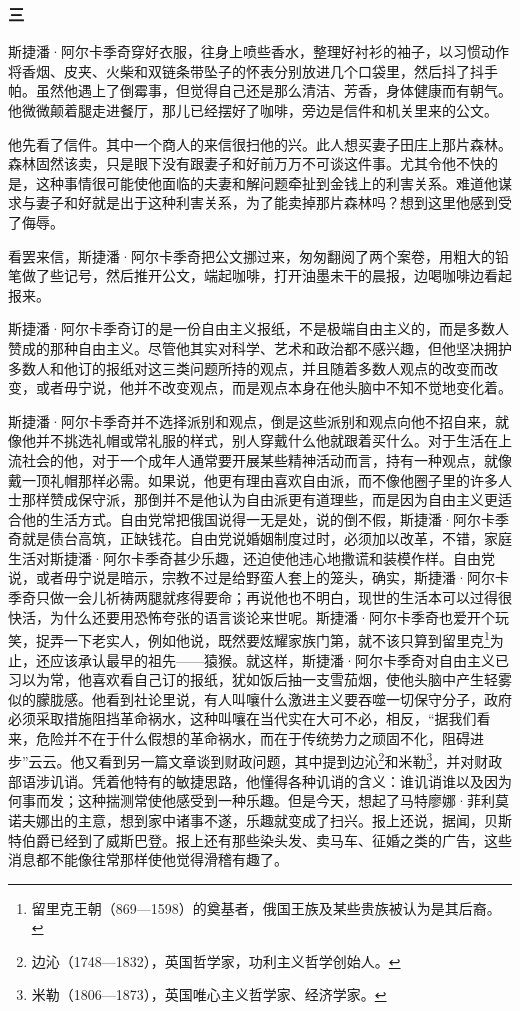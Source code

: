 \subsubsection*{三}

\par 斯捷潘·阿尔卡季奇穿好衣服，往身上喷些香水，整理好衬衫的袖子，以习惯动作将香烟、皮夹、火柴和双链条带坠子的怀表分别放进几个口袋里，然后抖了抖手帕。虽然他遇上了倒霉事，但觉得自己还是那么清洁、芳香，身体健康而有朝气。他微微颠着腿走进餐厅，那儿已经摆好了咖啡，旁边是信件和机关里来的公文。
\par 他先看了信件。其中一个商人的来信很扫他的兴。此人想买妻子田庄上那片森林。森林固然该卖，只是眼下没有跟妻子和好前万万不可谈这件事。尤其令他不快的是，这种事情很可能使他面临的夫妻和解问题牵扯到金钱上的利害关系。难道他谋求与妻子和好就是出于这种利害关系，为了能卖掉那片森林吗？想到这里他感到受了侮辱。
\par 看罢来信，斯捷潘·阿尔卡季奇把公文挪过来，匆匆翻阅了两个案卷，用粗大的铅笔做了些记号，然后推开公文，端起咖啡，打开油墨未干的晨报，边喝咖啡边看起报来。
\par 斯捷潘·阿尔卡季奇订的是一份自由主义报纸，不是极端自由主义的，而是多数人赞成的那种自由主义。尽管他其实对科学、艺术和政治都不感兴趣，但他坚决拥护多数人和他订的报纸对这三类问题所持的观点，并且随着多数人观点的改变而改变，或者毋宁说，他并不改变观点，而是观点本身在他头脑中不知不觉地变化着。
\par 斯捷潘·阿尔卡季奇并不选择派别和观点，倒是这些派别和观点向他不招自来，就像他并不挑选礼帽或常礼服的样式，别人穿戴什么他就跟着买什么。对于生活在上流社会的他，对于一个成年人通常要开展某些精神活动而言，持有一种观点，就像戴一顶礼帽那样必需。如果说，他更有理由喜欢自由派，而不像他圈子里的许多人士那样赞成保守派，那倒并不是他认为自由派更有道理些，而是因为自由主义更适合他的生活方式。自由党常把俄国说得一无是处，说的倒不假，斯捷潘·阿尔卡季奇就是债台高筑，正缺钱花。自由党说婚姻制度过时，必须加以改革，不错，家庭生活对斯捷潘·阿尔卡季奇甚少乐趣，还迫使他违心地撒谎和装模作样。自由党说，或者毋宁说是暗示，宗教不过是给野蛮人套上的笼头，确实，斯捷潘·阿尔卡季奇只做一会儿祈祷两腿就疼得要命；再说他也不明白，现世的生活本可以过得很快活，为什么还要用恐怖夸张的语言谈论来世呢。斯捷潘·阿尔卡季奇也爱开个玩笑，捉弄一下老实人，例如他说，既然要炫耀家族门第，就不该只算到留里克\footnote{留里克王朝（869—1598）的奠基者，俄国王族及某些贵族被认为是其后裔。}为止，还应该承认最早的祖先——猿猴。就这样，斯捷潘·阿尔卡季奇对自由主义已习以为常，他喜欢看自己订的报纸，犹如饭后抽一支雪茄烟，使他头脑中产生轻雾似的朦胧感。他看到社论里说，有人叫嚷什么激进主义要吞噬一切保守分子，政府必须采取措施阻挡革命祸水，这种叫嚷在当代实在大可不必，相反，“据我们看来，危险并不在于什么假想的革命祸水，而在于传统势力之顽固不化，阻碍进步”云云。他又看到另一篇文章谈到财政问题，其中提到边沁\footnote{边沁（1748—1832），英国哲学家，功利主义哲学创始人。}和米勒\footnote{米勒（1806—1873），英国唯心主义哲学家、经济学家。}，并对财政部语涉讥诮。凭着他特有的敏捷思路，他懂得各种讥诮的含义：谁讥诮谁以及因为何事而发；这种揣测常使他感受到一种乐趣。但是今天，想起了马特廖娜·菲利莫诺夫娜出的主意，想到家中诸事不遂，乐趣就变成了扫兴。报上还说，据闻，贝斯特伯爵已经到了威斯巴登。报上还有那些染头发、卖马车、征婚之类的广告，这些消息都不能像往常那样使他觉得滑稽有趣了。
